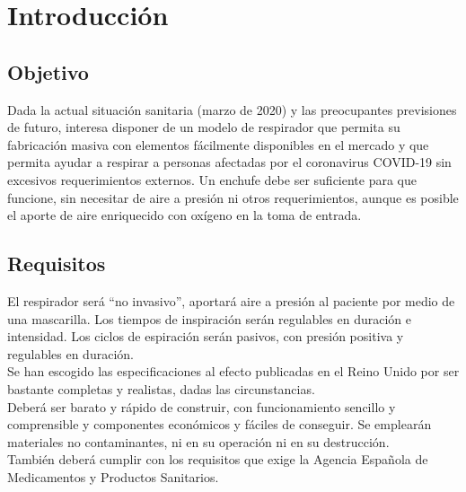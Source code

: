 \section{Introducción}
\subsection{Objetivo}
    Dada la actual situación sanitaria (marzo de 2020) y las preocupantes previsiones de futuro, interesa disponer de un modelo de respirador que permita su fabricación masiva con elementos fácilmente disponibles en el mercado y que permita ayudar a respirar a personas afectadas por el coronavirus COVID-19 sin excesivos requerimientos externos. Un enchufe debe ser suficiente para que funcione, sin necesitar de aire a presión ni otros requerimientos, aunque es posible el aporte de aire enriquecido con oxígeno en la toma de entrada.
\subsection{Requisitos}
    El respirador será “no invasivo”, aportará aire a presión al paciente por medio de una mascarilla. Los tiempos de inspiración serán regulables en duración e intensidad. Los ciclos de espiración serán pasivos, con presión positiva y regulables en duración.\\
    Se han escogido las especificaciones al efecto publicadas en el Reino Unido \cite{MHRA} por ser bastante completas y realistas, dadas las circunstancias.\\
    Deberá ser barato y rápido de construir, con funcionamiento sencillo y comprensible y componentes  económicos y fáciles de conseguir. Se emplearán materiales no contaminantes, ni en su operación ni en su destrucción.\\
    También deberá cumplir con los requisitos que exige la Agencia Española de Medicamentos y Productos
    Sanitarios. 